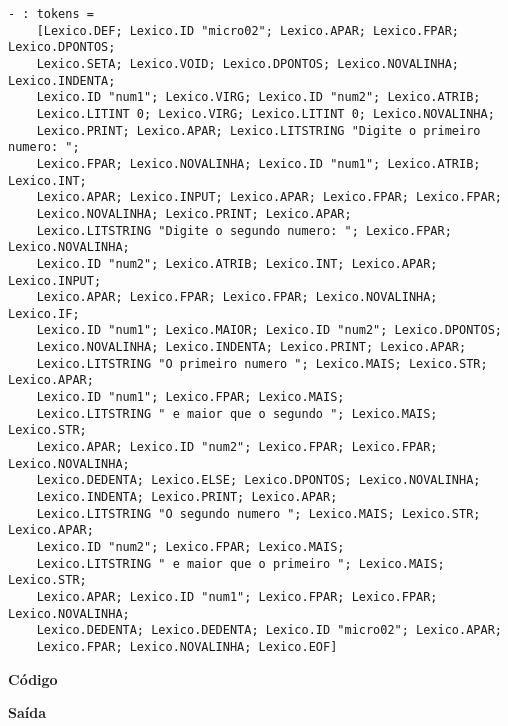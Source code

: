 \documentclass[hidelinks,12pt]{article}
\begin{document}
	\begin{lstlisting}[caption=Analisador Léxico]
	- : tokens =
	[Lexico.DEF; Lexico.ID "micro02"; Lexico.APAR; Lexico.FPAR; Lexico.DPONTOS;
	Lexico.SETA; Lexico.VOID; Lexico.DPONTOS; Lexico.NOVALINHA; Lexico.INDENTA;
	Lexico.ID "num1"; Lexico.VIRG; Lexico.ID "num2"; Lexico.ATRIB;
	Lexico.LITINT 0; Lexico.VIRG; Lexico.LITINT 0; Lexico.NOVALINHA;
	Lexico.PRINT; Lexico.APAR; Lexico.LITSTRING "Digite o primeiro numero: ";
	Lexico.FPAR; Lexico.NOVALINHA; Lexico.ID "num1"; Lexico.ATRIB; Lexico.INT;
	Lexico.APAR; Lexico.INPUT; Lexico.APAR; Lexico.FPAR; Lexico.FPAR;
	Lexico.NOVALINHA; Lexico.PRINT; Lexico.APAR;
	Lexico.LITSTRING "Digite o segundo numero: "; Lexico.FPAR; Lexico.NOVALINHA;
	Lexico.ID "num2"; Lexico.ATRIB; Lexico.INT; Lexico.APAR; Lexico.INPUT;
	Lexico.APAR; Lexico.FPAR; Lexico.FPAR; Lexico.NOVALINHA; Lexico.IF;
	Lexico.ID "num1"; Lexico.MAIOR; Lexico.ID "num2"; Lexico.DPONTOS;
	Lexico.NOVALINHA; Lexico.INDENTA; Lexico.PRINT; Lexico.APAR;
	Lexico.LITSTRING "O primeiro numero "; Lexico.MAIS; Lexico.STR; Lexico.APAR;
	Lexico.ID "num1"; Lexico.FPAR; Lexico.MAIS;
	Lexico.LITSTRING " e maior que o segundo "; Lexico.MAIS; Lexico.STR;
	Lexico.APAR; Lexico.ID "num2"; Lexico.FPAR; Lexico.FPAR; Lexico.NOVALINHA;
	Lexico.DEDENTA; Lexico.ELSE; Lexico.DPONTOS; Lexico.NOVALINHA;
	Lexico.INDENTA; Lexico.PRINT; Lexico.APAR;
	Lexico.LITSTRING "O segundo numero "; Lexico.MAIS; Lexico.STR; Lexico.APAR;
	Lexico.ID "num2"; Lexico.FPAR; Lexico.MAIS;
	Lexico.LITSTRING " e maior que o primeiro "; Lexico.MAIS; Lexico.STR;
	Lexico.APAR; Lexico.ID "num1"; Lexico.FPAR; Lexico.FPAR; Lexico.NOVALINHA;
	Lexico.DEDENTA; Lexico.DEDENTA; Lexico.ID "micro02"; Lexico.APAR;
	Lexico.FPAR; Lexico.NOVALINHA; Lexico.EOF]
	\end{lstlisting}
	
	
	{\large \textbf{Código} }
			
	
	{\large \textbf{Saída}}
	
\end{document}
